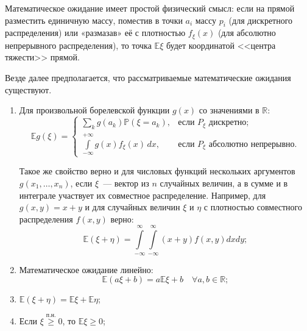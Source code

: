 Математическое ожидание имеет простой физический смысл: если на прямой разместить единичную массу, поместив в точки $a_i$ массу $p_i$ (для дискретного распределения) или «размазав» её с плотностью $f_\xi(x)$ (для абсолютно непрерывного распределения), то точка $\mathbb{E}\xi$ будет координатой <<центра тяжести>> прямой.

\begin{namedthm}
    Везде далее предполагается, что рассматриваемые математические ожидания существуют.
\begin{enumerate}
    \item 
        Для произвольной борелевской функции $g(x)$ со значениями в $\mathbb{R}$:
        \begin{equation*}
        \mathbb{E} g(\xi) =
        \begin{cases}
            \sum\limits_{k} g\left(a_{k}\right) \mathbb{P}\left(\xi=a_{k}\right), & \text {если~} P_{\xi} \text {~дискретно}; \\
            \int\limits_{-\infty}^{+\infty} g(x) f_{\xi}(x) \, dx, & \text {если~} P_{\xi} \text{~абсолютно непрерывно.}
        \end{cases}
        \end{equation*}

        Такое же свойство верно и для числовых функций нескольких аргументов $g(x_1, \ldots, x_n)$, если $\xi$~--- вектор из $n$ случайных величин, а в сумме и в интеграле участвует их совместное распределение. Например, для $g(x,y) = x + y$ и для случайных величин $\xi$ и $\eta$ с плотностью совместного распределения $f(x,y)$ верно: 
        \begin{equation}
            \label{expectation_of_sum}
            \mathbb{E}(\xi+\eta)=\int\limits_{-\infty}^{\infty} \int\limits_{-\infty}^{\infty}(x+y) f(x, y) d x d y;
        \end{equation}
    \item 
        Математическое ожидание линейно:
        \begin{equation*}
            \mathbb{E}(a \xi + b) = a \mathbb{E}\xi + b \quad \forall a,b \in \mathbb{R};
        \end{equation*}
    \item
        $\mathbb{E}(\xi + \eta) = \mathbb{E}\xi + \mathbb{E}\eta$;
    
    \item 
        Если $\xi \overset{\text{п.н.}}{\geqslant} 0$, то $\mathbb{E}\xi \geqslant 0$;
    

\end{enumerate}
\end{namedthm}
